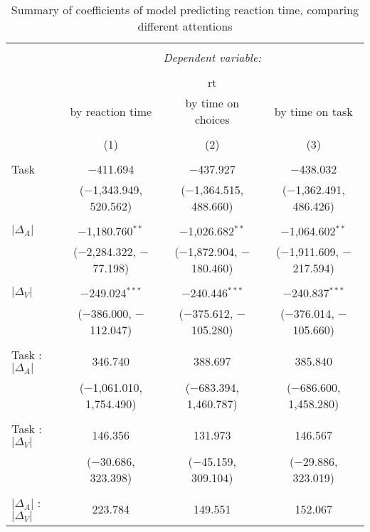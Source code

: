 
\begin{table}[h] \centering 
  \caption{Summary of coefficients of model predicting reaction time, comparing different attentions} 
  \label{table:choiceModelAttention} 
\begin{tabular}{@{\extracolsep{5pt}}lccc} 
\\[-1.8ex]\hline 
\hline \\[-1.8ex] 
 & \multicolumn{3}{c}{\textit{Dependent variable:}} \\ 
\cline{2-4} 
\\[-1.8ex] & \multicolumn{3}{c}{rt} \\ 
 & by reaction time & by time on choices & by time on task \\ 
\\[-1.8ex] & (1) & (2) & (3)\\ 
\hline \\[-1.8ex] 
 Task & $-$411.694 & $-$437.927 & $-$438.032 \\ 
  & ($-$1,343.949, 520.562) & ($-$1,364.515, 488.660) & ($-$1,362.491, 486.426) \\ 
  & & & \\ 
 $\vert\Delta_A\vert$ & $-$1,180.760$^{**}$ & $-$1,026.682$^{**}$ & $-$1,064.602$^{**}$ \\ 
  & ($-$2,284.322, $-$77.198) & ($-$1,872.904, $-$180.460) & ($-$1,911.609, $-$217.594) \\ 
  & & & \\ 
 $\vert\Delta_V\vert$ & $-$249.024$^{***}$ & $-$240.446$^{***}$ & $-$240.837$^{***}$ \\ 
  & ($-$386.000, $-$112.047) & ($-$375.612, $-$105.280) & ($-$376.014, $-$105.660) \\ 
  & & & \\ 
 Task : $\vert\Delta_A\vert$ & 346.740 & 388.697 & 385.840 \\ 
  & ($-$1,061.010, 1,754.490) & ($-$683.394, 1,460.787) & ($-$686.600, 1,458.280) \\ 
  & & & \\ 
 Task : $\vert\Delta_V\vert$ & 146.356 & 131.973 & 146.567 \\ 
  & ($-$30.686, 323.398) & ($-$45.159, 309.104) & ($-$29.886, 323.019) \\ 
  & & & \\ 
 $\vert\Delta_A\vert$ : $\vert\Delta_V\vert$ & 223.784 & 149.551 & 152.067 \\ 

\end{tabular}
\end{table}
